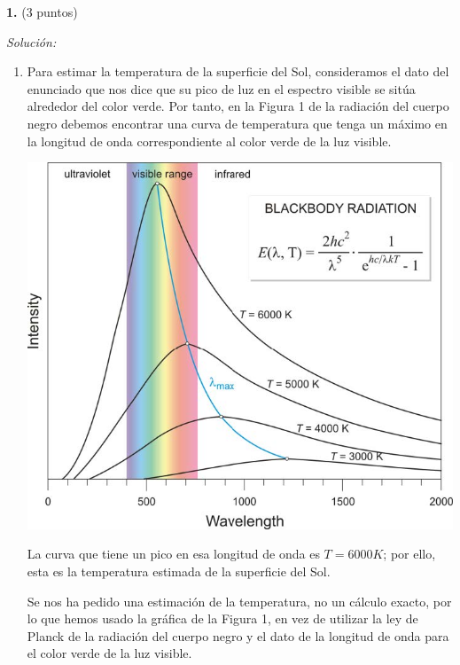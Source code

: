 \textbf{1.} (3 puntos)


\vspace{20px}
\textit{Solución:}
\\

\begin{enumerate}
[label=\alph*)]
    \item Para estimar la temperatura de la superficie del Sol, consideramos el dato del enunciado que nos dice que su pico de luz
    en el espectro visible se sitúa alrededor del color verde. Por tanto, en la Figura 1 de la radiación del cuerpo negro
    debemos encontrar una curva de temperatura que tenga un máximo en la longitud de onda correspondiente al color verde de la luz visible.\\

    \begin{center}
        \includegraphics[scale=0.45]{files/img1}
    \end{center}
    \vspace{20px}

    La curva que tiene un pico en esa longitud de onda es $T = 6000K$; por ello, esta es la temperatura
    estimada de la superficie del Sol.

    Se nos ha pedido una estimación de la temperatura, no un cálculo exacto,
    por lo que hemos usado la gráfica de la Figura 1, en vez de
    utilizar la ley de Planck de la radiación del cuerpo negro y el dato de la longitud de onda para el color verde de la luz visible.


\end{enumerate}
